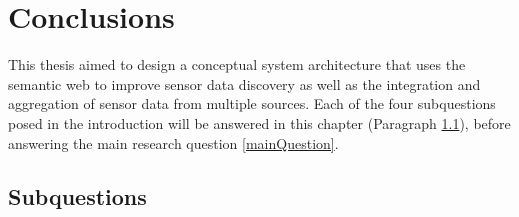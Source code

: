 
\chapter{Conclusions}
\label{chap:conclusion}

This thesis aimed to design a conceptual system architecture that uses the semantic web to improve sensor data discovery as well as the integration and aggregation of sensor data from multiple sources. Each of the four subquestions posed in the introduction will be answered in this chapter (Paragraph \ref{subquestions}), before answering the main research question \ref{mainQuestion}.

\section{Subquestions}
\label{subquestions}
